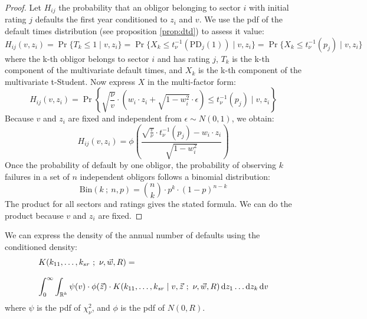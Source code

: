 \documentclass[11pt,fleqn]{book} %
\begin{document}
\begin{proof}
	Let $H_{ij}$ the probability that an obligor belonging to sector $i$
	with initial rating $j$ defaults the first year conditioned to $z_i$ 
	and $v$. We use the pdf of the default times distribution (see proposition 
	\ref{prop:dtd}) to assess it value:
	\begin{displaymath}
		H_{ij}(v,z_i) = 
		\Pr\{T_k \le 1 \mid v, z_i\} = 
		\Pr\{ X_k \le t_{\nu}^{-1}(\text{PD}_j(1)) \mid v, z_i\} = 
		\Pr\{ X_k \le t_{\nu}^{-1}(p_j) \mid v, z_i\}
	\end{displaymath}
	where the k-th obligor belongs to sector $i$ and has rating $j$, 
	$T_k$ is the k-th component of the multivariate default 
	times, and $X_k$ is the k-th component of the multivariate t-Student. 
	Now express $X$ in the multi-factor form:
	\begin{displaymath}
		H_{ij}(v,z_i) = \Pr \left\{ 
		\sqrt{\frac{\nu}{v}} \cdot \left( w_i \cdot z_i + \sqrt{1-w_i^2} \cdot \epsilon\right)
		\le t_{\nu}^{-1}(p_j) \mid v, z_i
		\right\}
	\end{displaymath}
	Because $v$ and $z_i$ are fixed and independent from $\epsilon \sim N(0,1)$, we obtain:
	\begin{displaymath}
		H_{ij}(v,z_i) = \phi\left(  
		\frac{\sqrt{\frac{v}{\nu}} \cdot t_{\nu}^{-1}(p_j) - w_i\cdot z_i}{\sqrt{1-w_i^2}}
		\right)
	\end{displaymath}
	Once the probability of default by one obligor, the probability of 
	observing $k$ failures in a set of $n$ independent obligors follows 
	a binomial distribution:
	\begin{displaymath}
		\text{Bin}(k\ ;\ n,p) = \binom{n}{k} \cdot p^k \cdot (1-p)^{n-k}
	\end{displaymath}
	The product for all sectors and ratings gives the stated formula. 
	We can do the product because $v$ and $z_i$ are fixed.
\end{proof}

\begin{corollary}
	We can express the density of the annual number of defaults using 
	the conditioned density:
	\begin{displaymath}
		\begin{array}{l}
			K(k_{11},\dots,k_{sr}\ ;\ \nu, \vec{w}, R) =                \\
			\\
			\displaystyle \int_0^{\infty} \int_{\mathbb{R}^k}                                         
			\psi(v) \cdot \phi(\vec{z}) \cdot
			K(k_{11},\dots,k_{sr} \mid v,\vec{z}\ ;\ \nu,\vec{w}, R) 
			\mathop{\mathrm{{}d}}\mathopen{} z_1 \dots \mathop{\mathrm{{}d}}\mathopen{} z_k \mathop{\mathrm{{}d}}\mathopen{} v
		\end{array}
	\end{displaymath}
	where $\psi$ is the pdf of $\chi_{\nu}^2$, and $\phi$ is the pdf of $N(0,R)$.
\end{corollary}
\end{document}

